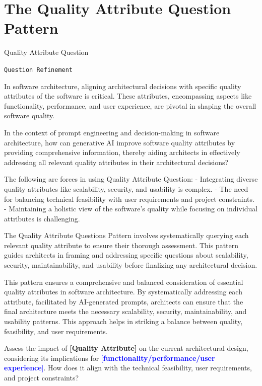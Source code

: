 \section{The Quality Attribute Question Pattern} \label{sec:quality-attribute-question}

 Quality Attribute Question

\texttt{Question Refinement}

In software architecture, aligning architectural decisions with specific quality attributes of the software is critical. These attributes, encompassing aspects like functionality, performance, and user experience, are pivotal in shaping the overall software quality.

 In the context of prompt engineering and decision-making in software architecture, how can generative AI improve software quality attributes by providing comprehensive information, thereby aiding architects in effectively addressing all relevant quality attributes in their architectural decisions?

 The following are forces in using Quality Attribute Question:
\newline
- Integrating diverse quality attributes like scalability, security, and usability is complex.
\newline
- The need for balancing technical feasibility with user requirements and project constraints.
\newline
- Maintaining a holistic view of the software's quality while focusing on individual attributes is challenging.

 The Quality Attribute Questions Pattern involves systematically querying each relevant quality attribute to ensure their thorough assessment. This pattern guides architects in framing and addressing specific questions about scalability, security, maintainability, and usability before finalizing any architectural decision.

 This pattern ensures a comprehensive and balanced consideration of essential quality attributes in software architecture. By systematically addressing each attribute, facilitated by AI-generated prompts, architects can ensure that the final architecture meets the necessary scalability, security, maintainability, and usability patterns. This approach helps in striking a balance between quality, feasibility, and user requirements.

Assess the impact of \textcolor{mycolorgreen}{\textbf{[Quality Attribute]}} on the current architectural design, considering its implications for \textcolor{blue}{[\textbf{functionality/performance/user experience}]}. How does it align with the technical feasibility, user requirements, and project constraints?

